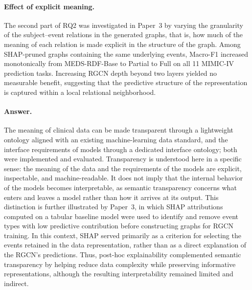 \paragraph{Effect of explicit meaning.}
The second part of RQ2 was investigated in Paper~3 by varying the granularity of the subject--event relations in the generated graphs, that is, how much of the meaning of each relation is made explicit in the structure of the graph. Among SHAP-pruned graphs containing the same underlying events, Macro-F1 increased monotonically from MEDS-RDF-Base to Partial to Full on all 11 MIMIC-IV prediction tasks. Increasing RGCN depth beyond two layers yielded no measurable benefit, suggesting that the predictive structure of the representation is captured within a local relational neighborhood.

\paragraph{Answer.}
The meaning of clinical data can be made transparent through a lightweight ontology aligned with an existing machine-learning data standard, and the interface requirements of models through a dedicated interface ontology; both were implemented and evaluated. Transparency is understood here in a specific sense: the meaning of the data and the requirements of the models are explicit, inspectable, and machine-readable. It does not imply that the internal behavior of the models becomes interpretable, as semantic transparency concerns what enters and leaves a model rather than how it arrives at its output. This distinction is further illustrated by Paper~3, in which SHAP attributions computed on a tabular baseline model were used to identify and remove event types with low predictive contribution before constructing graphs for RGCN training. In this context, SHAP served primarily as a criterion for selecting the events retained in the data representation, rather than as a direct explanation of the RGCN's predictions. Thus, post-hoc explainability complemented semantic transparency by helping reduce data complexity while preserving informative representations, although the resulting interpretability remained limited and indirect.

